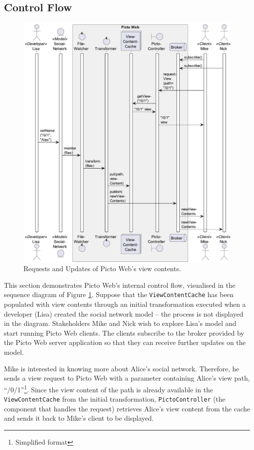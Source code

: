 \documentclass[preprint,12pt, a4paper]{elsarticle}
\begin{document}
\subsection{Control Flow}

\begin{figure}[h]
	\centering
	\includegraphics[width=1\linewidth]{images/sequence}
	\caption{Requests and Updates of Picto Web's view contents.}
	\label{fig:sequence}
\end{figure}

This section demonstrates Picto Web's internal control flow, visualised in the sequence diagram of Figure \ref{fig:sequence}. Suppose that the \texttt{ViewContentCache} has been populated with view contents through an initial transformation executed when a developer (Lisa) created the social network model -- the process is not displayed in the diagram. Stakeholders Mike and Nick wish to explore Lisa's model and start running Picto Web clients. The clients subscribe to the broker provided by the Picto Web server application so that they can receive further updates on the model. 

Mike is interested in knowing more about Alice's social network. Therefore, he sends a view request to Picto Web with a parameter containing Alice's view path, ``/0/1''\footnote{Simplified format}. Since the view content of the path is already available in the \texttt{View\-Content\-Cache} from the initial transformation, \texttt{Picto\-Controller} (the component that handles the request) retrieves Alice's view content from the cache and sends it back to Mike's client to be displayed.
\end{document}

